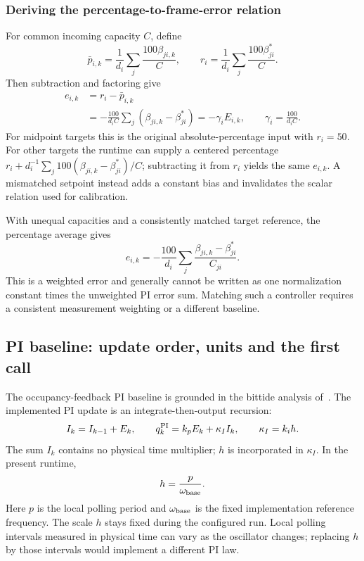 \subsubsection{Deriving the percentage-to-frame-error relation}
For common incoming capacity $C$, define
\[
 \bar p_{i,k}=\frac1{d_i}\sum_j\frac{100\beta_{ji,k}}{C},\qquad
 r_i=\frac1{d_i}\sum_j\frac{100\beta^*_{ji}}{C}.
\]
Then subtraction and factoring give
\begin{align}
 e_{i,k}&=r_i-\bar p_{i,k}\\
 &=-\frac{100}{d_iC}\sum_j(\beta_{ji,k}-\beta^*_{ji})
 =-\gamma_i E_{i,k},\qquad \gamma_i=\frac{100}{d_iC}.
 \label{detail:eq:fpi_percent}
\end{align}
For midpoint targets this is the original absolute-percentage input with
$r_i=50$. For other targets the runtime can supply a centered percentage
$r_i+d_i^{-1}\sum_j100(\beta_{ji,k}-\beta^*_{ji})/C$; subtracting it from
$r_i$ yields the same $e_{i,k}$. A mismatched setpoint instead adds a
constant bias and invalidates the scalar relation used for calibration.

With unequal capacities and a consistently matched target reference, the
percentage average gives
\[
 e_{i,k}=-\frac{100}{d_i}\sum_j
 \frac{\beta_{ji,k}-\beta^*_{ji}}{C_{ji}}.
\]
This is a weighted error and generally cannot be written as one normalization constant
times the unweighted PI error sum. Matching such a controller requires a
consistent measurement weighting or a different baseline.

\subsection{PI baseline: update order, units and the first call}

The occupancy-feedback PI baseline is grounded in the bittide analysis
of~\cite{lall2022resistance}. The implemented PI update is an
integrate-then-output recursion:
\begin{equation}
 I_k=I_{k-1}+E_k,\qquad
 q_k^{\rm PI}=k_pE_k+\kappa_I I_k,\qquad \kappa_I=k_i h.
 \label{detail:eq:fpi_native}
\end{equation}
The sum $I_k$ contains no physical time multiplier; $h$ is incorporated in
$\kappa_I$. In the present runtime,
\begin{equation}
 h=\frac{p}{\omega_{\rm base}}.
 \label{detail:eq:fpd_h}
\end{equation}
Here $p$ is the local polling period and $\omega_{\rm base}$ is the fixed implementation reference frequency. The scale $h$ stays fixed during the configured run. Local polling intervals measured
in physical time can vary as the oscillator changes; replacing $h$ by
those intervals would implement a different PI law.

